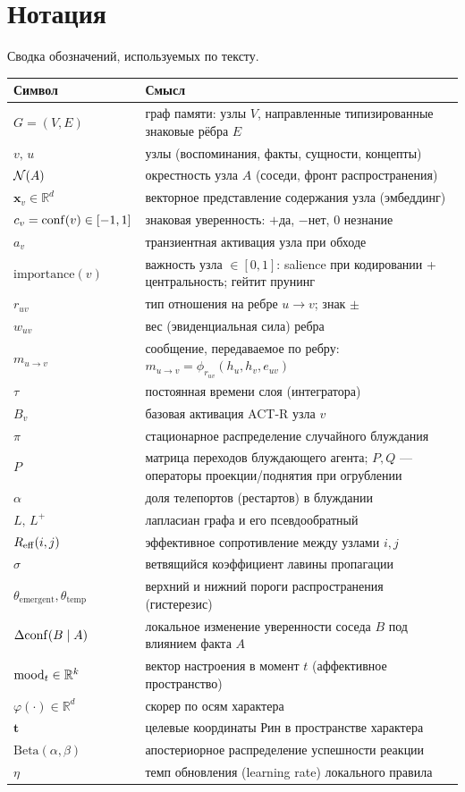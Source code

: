 \chapter{Нотация}
\label{ch:notation}

Сводка обозначений, используемых по тексту.

\begin{longtable}{p{} p{}}
\toprule
\textbf{Символ} & \textbf{Смысл} \\
\midrule
\endhead
$G=(V,E)$ & граф памяти: узлы $V$, направленные типизированные знаковые рёбра $E$ \\
$v,\,u$ & узлы (воспоминания, факты, сущности, концепты) \\
$\mathcal{N}(A)$ & окрестность узла $A$ (соседи, фронт распространения) \\
$\mathbf{x}_v\in\mathbb{R}^d$ & векторное представление содержания узла (эмбеддинг) \\
$c_v=\mathrm{conf}(v)\in[-1,1]$ & знаковая уверенность: $+$да, $-$нет, $0$ незнание \\
$a_v$ & транзиентная активация узла при обходе \\
$\text{importance}(v)$ & важность узла $\in [0,1]$: salience при кодировании + центральность; гейтит прунинг \\
$r_{uv}$ & тип отношения на ребре $u\to v$; знак $\pm$ \\
$w_{uv}$ & вес (эвиденциальная сила) ребра \\
$m_{u\to v}$ & сообщение, передаваемое по ребру: $m_{u\to v}=\phi_{r_{uv}}(h_u,h_v,e_{uv})$ \\
$\tau$ & постоянная времени слоя (интегратора) \\
$B_v$ & базовая активация ACT-R узла $v$ \\
$\pi$ & стационарное распределение случайного блуждания \\
$P$ & матрица переходов блуждающего агента; $P,Q$ --- операторы проекции/поднятия при огрублении \\
$\alpha$ & доля телепортов (рестартов) в блуждании \\
$L,\,L^{+}$ & лапласиан графа и его псевдообратный \\
$R_{\mathrm{eff}}(i,j)$ & эффективное сопротивление между узлами $i,j$ \\
$\sigma$ & ветвящийся коэффициент лавины пропагации \\
$\theta_{\text{emergent}},\theta_{\text{temp}}$ & верхний и нижний пороги распространения (гистерезис) \\
$\Delta\mathrm{conf}(B\mid A)$ & локальное изменение уверенности соседа $B$ под влиянием факта $A$ \\
$\mathrm{mood}_t\in\mathbb{R}^k$ & вектор настроения в момент $t$ (аффективное пространство) \\
$\varphi(\cdot)\in\mathbb{R}^d$ & скорер по осям характера \\
$\mathbf{t}$ & целевые координаты Рин в пространстве характера \\
$\mathrm{Beta}(\alpha,\beta)$ & апостериорное распределение успешности реакции \\
$\eta$ & темп обновления (learning rate) локального правила \\
\bottomrule
\end{longtable}

